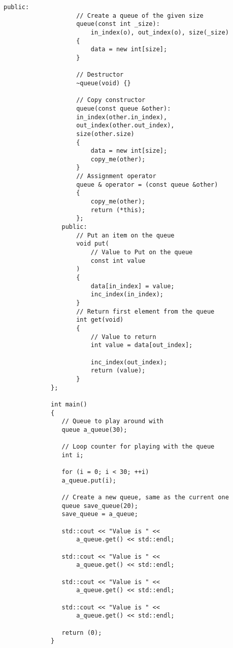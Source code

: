 \begin{LTR}
\begin{lstlisting}[style=C++Style]
             	public:
             		// Create a queue of the given size
             		queue(const int _size):
             			in_index(o), out_index(o), size(_size)
             		{
             			data = new int[size];
             		}

             		// Destructor
             		~queue(void) {}

             		// Copy constructor
             		queue(const queue &other):
             		in_index(other.in_index),
             		out_index(other.out_index),
             		size(other.size)
             		{
             			data = new int[size];
             			copy_me(other);
             		}
             		// Assignment operator
             		queue & operator = (const queue &other)
             		{
             			copy_me(other);
             			return (*this);
             		};
             	public:
             		// Put an item on the queue
             		void put(
             			// Value to Put on the queue
             			const int value
             		)
             		{
             			data[in_index] = value;
             			inc_index(in_index);
             		}
             		// Return first element from the queue
             		int get(void)
             		{
             			// Value to return
             			int value = data[out_index];

             			inc_index(out_index);
             			return (value);
             		}
             };

             int main()
             {
             	// Queue to play around with
             	queue a_queue(30);

             	// Loop counter for playing with the queue
             	int i;

             	for (i = 0; i < 30; ++i)
             	a_queue.put(i);

             	// Create a new queue, same as the current one
             	queue save_queue(20);
            	save_queue = a_queue;

             	std::cout << "Value is " <<
             		a_queue.get() << std::endl;

             	std::cout << "Value is " <<
             		a_queue.get() << std::endl;

             	std::cout << "Value is " <<
             		a_queue.get() << std::endl;

             	std::cout << "Value is " <<
             		a_queue.get() << std::endl;

             	return (0);
             }
        \end{lstlisting}
\end{LTR}